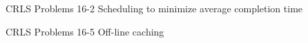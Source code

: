 

\begin{homeworkProblem}

CRLS Problems 16-2 Scheduling to minimize average completion time

\problemAnswer{
}

\end{homeworkProblem}




\begin{homeworkProblem}

CRLS Problems 16-5 Off-line caching

\problemAnswer{
}

\end{homeworkProblem}





